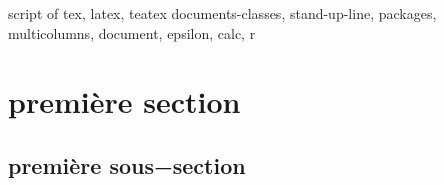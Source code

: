 \documentclass {os}
\begin{document}
\maketitle script of tex, latex, teatex
\tableofcontents documents-classes, stand-up-line, packages, multicolumns, document, epsilon, calc, r
\section{première section}
\subsection{première sous−section}
\end{document}
